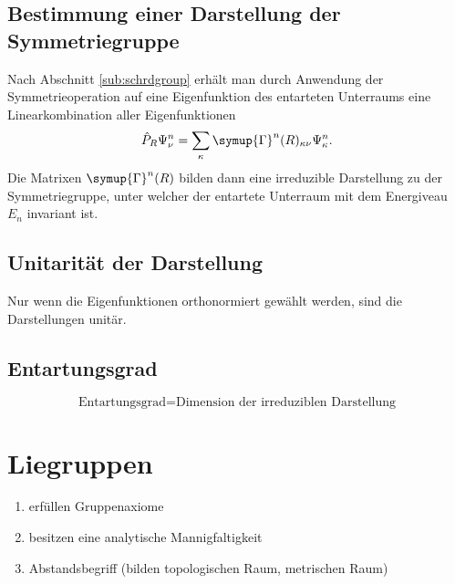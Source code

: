 \documentclass[
  captions=tableheading,  %
  titlepage=firstiscover, %
]{scrartcl}
\begin{document}
\subsection{Bestimmung einer Darstellung der Symmetriegruppe}
Nach Abschnitt \ref{sub:schrdgroup} erhält man durch Anwendung der Symmetrieoperation auf eine 
Eigenfunktion des entarteten Unterraums eine Linearkombination aller Eigenfunktionen
\begin{equation*}
  \hat{P}_R \Psi_\nu^n = \sum_\kappa \symup{\Gamma}^n(R)_{\kappa \nu} \Psi_\kappa^n .
\end{equation*}
Die Matrixen $\symup{\Gamma}^n(R)$ bilden dann eine irreduzible Darstellung zu der Symmetriegruppe, unter welcher 
der entartete Unterraum mit dem Energiveau $E_n$ invariant ist.
\subsection{Unitarität der Darstellung}
Nur wenn die Eigenfunktionen orthonormiert gewählt werden, sind die Darstellungen unitär.
\subsection{Entartungsgrad}
\begin{equation*}
  \text{Entartungsgrad} = \text{Dimension der irreduziblen Darstellung}
\end{equation*}
\section{Liegruppen}
\begin{enumerate}
\item erfüllen Gruppenaxiome 
\item besitzen eine analytische Mannigfaltigkeit
\item Abstandsbegriff (bilden topologischen Raum, metrischen Raum)
\end{enumerate}
\end{document}
